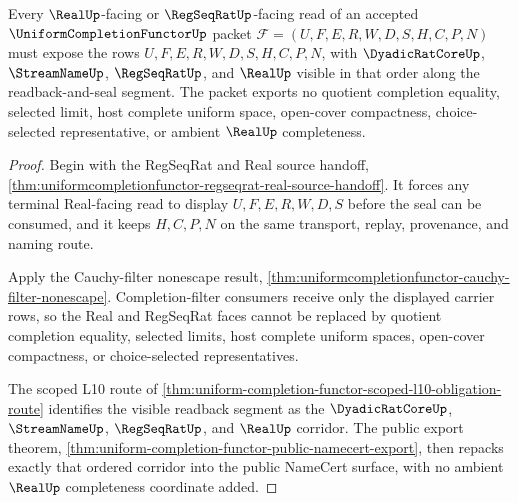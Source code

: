 \begin{theorem}
\label{thm:uniform-completion-functor-real-regseqrat-l10-nonescape}
Every $\RealUp$-facing or $\RegSeqRatUp$-facing read of an accepted $\UniformCompletionFunctorUp$ packet $\mathcal{F}=(U,F,E,R,W,D,S,H,C,P,N)$ must expose the rows $U,F,E,R,W,D,S,H,C,P,N$, with $\DyadicRatCoreUp$, $\StreamNameUp$, $\RegSeqRatUp$, and $\RealUp$ visible in that order along the readback-and-seal segment. The packet exports no quotient completion equality, selected limit, host complete uniform space, open-cover compactness, choice-selected representative, or ambient $\RealUp$ completeness.
\end{theorem}
\begin{proof}
Begin with the RegSeqRat and Real source handoff, \autoref{thm:uniformcompletionfunctor-regseqrat-real-source-handoff}. It forces any terminal Real-facing read to display $U,F,E,R,W,D,S$ before the seal can be consumed, and it keeps $H,C,P,N$ on the same transport, replay, provenance, and naming route.

Apply the Cauchy-filter nonescape result, \autoref{thm:uniformcompletionfunctor-cauchy-filter-nonescape}. Completion-filter consumers receive only the displayed carrier rows, so the Real and RegSeqRat faces cannot be replaced by quotient completion equality, selected limits, host complete uniform spaces, open-cover compactness, or choice-selected representatives.

The scoped L10 route of \autoref{thm:uniform-completion-functor-scoped-l10-obligation-route} identifies the visible readback segment as the $\DyadicRatCoreUp$, $\StreamNameUp$, $\RegSeqRatUp$, and $\RealUp$ corridor. The public export theorem, \autoref{thm:uniform-completion-functor-public-namecert-export}, then repacks exactly that ordered corridor into the public NameCert surface, with no ambient $\RealUp$ completeness coordinate added.
\end{proof}

